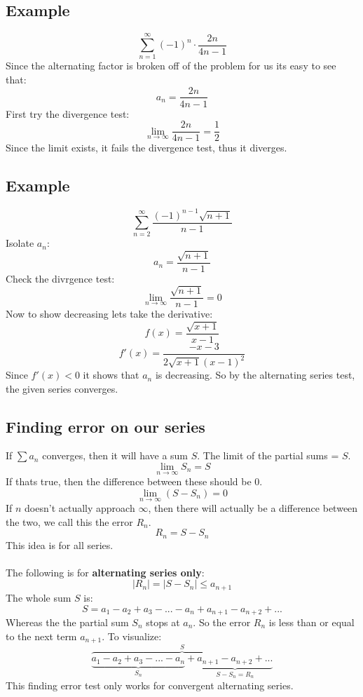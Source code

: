 \documentclass{article}
\begin{document}
    \subsection{Example}
        \[\sum_{n = 1}^{\infty} (-1)^n \cdot \frac{2n}{4n-1} \]
        Since the alternating factor is broken off of the problem for us its easy to see that:
        \[a_n = \frac{2n}{4n-1}\]
        First try the divergence test:
        \[\lim_{n \to \infty} \frac{2n}{4n-1} = \frac{1}{2}\]
        Since the limit exists, it fails the divergence test, thus it diverges.
        
    \subsection{Example}
        \[\sum_{n=2}^{\infty} \frac{(-1)^{n-1} \sqrt{n+1}}{n-1}\]
        Isolate \(a_n\):
        \[a_n = \frac{\sqrt{n+1}}{n-1}\]
        Check the divrgence test:
        \[\lim_{n \to \infty} \frac{\sqrt{n+1}}{n-1} = 0\]
        Now to show decreasing lets take the derivative:
        \[f(x) = \frac{\sqrt{x+1}}{x-1}\]
        \[f'(x) = \frac{-x-3}{2\sqrt{x+1}(x-1)^2}\]
        Since \(f'(x) < 0\) it shows that \(a_n\) is decreasing. So by the alternating series test, the given series converges.
    
    \subsection{Finding error on our series}
        If \(\sum a_n\) converges, then it will have a sum \(S\). The limit of the partial sums = \(S\).
        \[\lim_{n \to \infty}  S_n = S\]
        If thats true, then the difference between these should be 0.
        \[\lim_{n \to \infty} (S - S_n) = 0\]
        If \(n\) doesn't actually approach \(\infty\), then there will actually be a difference between the two, we call this the error \(R_n\).
        \[R_n = S - S_n\]
        This idea is for all series.\\
        \\
        The following is for \textbf{alternating series only}:
        \[|R_n| = |S - S_n| \leq a_{n+1}\]
        The whole sum \(S\) is:
        \[S=a_1 - a_2 + a_3 - ... - a_n + a_{n+1} - a_{n+2} + ...\]
        Whereas the the partial sum \(S_n\) stops at \(a_n\). So the error \(R_n\) is less than or equal to the next term \(a_{n+1}\).
        To visualize:
        \[\overbrace{\underbrace{a_1 - a_2 + a_3 - ... - a_n}_{S_n} + \underbrace{a_{n+1} - a_{n+2} + ...}_{S - S_n = R_n}}^{S} \]
        This finding error test only works for convergent alternating series.
        
\end{document}
